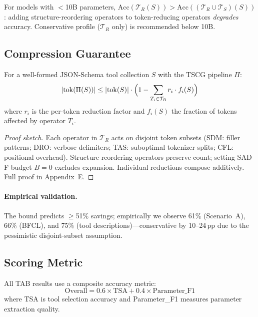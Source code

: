 \begin{corollary}
\label{cor:interaction}
For models with ${<}$10B parameters, $\mathrm{Acc}(\mathcal{T}_R(S)) > \mathrm{Acc}((\mathcal{T}_R \cup \mathcal{T}_S)(S))$: adding structure-reordering operators to token-reducing operators \emph{degrades} accuracy.
Conservative profile ($\mathcal{T}_R$ only) is recommended below 10B.
\end{corollary}

\subsection{Compression Guarantee}

\begin{theorem}
\label{thm:compression}
For a well-formed JSON-Schema tool collection $S$ with the TSCG pipeline $\Pi$:
\begin{equation}
  |\mathrm{tok}(\Pi(S))| \leq |\mathrm{tok}(S)| \cdot \Bigl(1 - \sum_{T_i \in \mathcal{T}_R} r_i \cdot f_i(S)\Bigr)
  \label{eq:compression-bound}
\end{equation}
where $r_i$ is the per-token reduction factor and $f_i(S)$ the fraction of tokens affected by operator $T_i$.
\end{theorem}

\begin{proof}[Proof sketch]
Each operator in $\mathcal{T}_R$ acts on disjoint token subsets (SDM: filler patterns; DRO: verbose delimiters; TAS: suboptimal tokenizer splits; CFL: positional overhead).
Structure-reordering operators preserve count; setting SAD-F budget $B{=}0$ excludes expansion.
Individual reductions compose additively.
Full proof in Appendix~E.
\end{proof}

\paragraph{Empirical validation.}
The bound predicts $\geq$51\% savings; empirically we observe 61\% (Scenario~A), 66\% (BFCL), and 75\% (tool descriptions)---conservative by 10--24\,pp due to the pessimistic disjoint-subset assumption.

\subsection{Scoring Metric}

All TAB results use a composite accuracy metric:
\begin{equation}
\text{Overall} = 0.6 \times \text{TSA} + 0.4 \times \text{Parameter\_F1}
\end{equation}
where TSA is tool selection accuracy and Parameter\_F1 measures parameter extraction quality.

